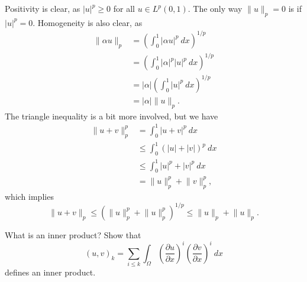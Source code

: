 \begin{solution}
    Positivity is clear, as $\lvert u \rvert^p \geq 0$ for all $u \in L^p(0, 1)$.
    The only way $\lVert u \rVert_p = 0$ is if $\lvert u \rvert^p = 0$.
    Homogeneity is also clear, as
    \begin{align*}
        \lVert \alpha u \rVert_p &= \left( \int_{0}^{1} \lvert \alpha u \rvert^p \ dx \right)^{1/p} \\
        &= \left( \int_{0}^{1} \lvert \alpha \rvert^p \lvert u \rvert^p \ dx \right)^{1/p} \\
        &= \lvert \alpha \rvert \left( \int_{0}^{1} \lvert u \rvert^p \ dx \right)^{1/p} \\
        &= \lvert \alpha \rvert \lVert u \rVert_p.
    \end{align*}
    The triangle inequality is a bit more involved, but we have
    \begin{align*}
        \lVert u + v \rVert_p^p &= \int_{0}^{1} \lvert u + v \rvert^p \ dx \\
        &\leq \int_{0}^{1} \left( \lvert u \rvert + \lvert v \rvert \right)^p \ dx \\
        &\leq \int_{0}^{1} \lvert u \rvert^p + \lvert v \rvert^p \ dx \\
        &= \lVert u \rVert_p^p + \lVert v \rVert_p^p,
    \end{align*}
    which implies
    \begin{equation*}
        \lVert u + v \rVert_p \leq \left( \lVert u \rVert_p^p + \lVert u \rVert_p^p \right)^{1/p} \leq \lVert u \rVert_p + \lVert u \rVert_p.
    \end{equation*}
\end{solution}

\begin{exercise}
    What is an inner product? Show that
    \begin{equation*}
        (u, v)_k = \sum_{i \leq k} \int_{\Omega} \left( \frac{\partial u}{\partial x} \right)^i \left( \frac{\partial v}{\partial x} \right)^i \ dx
    \end{equation*}
    defines an inner product.
\end{exercise}

